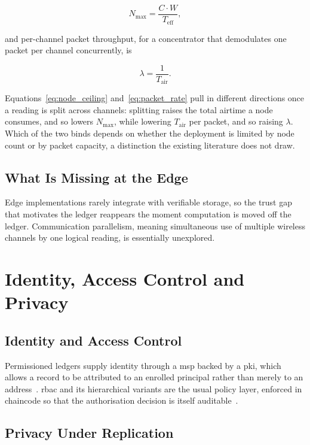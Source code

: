 \documentclass[12pt,a4paper,oneside]{book}
\begin{document}
\begin{equation}
  N_{\max} = \frac{C \cdot W}{T_{\text{eff}}},
  \label{eq:node_ceiling}
\end{equation}

and per-channel packet throughput, for a concentrator that demodulates one
packet per channel concurrently, is

\begin{equation}
  \lambda = \frac{1}{T_{\text{air}}}.
  \label{eq:packet_rate}
\end{equation}

Equations~\ref{eq:node_ceiling} and~\ref{eq:packet_rate} pull in different
directions once a reading is split across channels: splitting raises the total
airtime a node consumes, and so lowers $N_{\max}$, while lowering
$T_{\text{air}}$ per packet, and so raising $\lambda$. Which of the two binds
depends on whether the deployment is limited by node count or by packet
capacity, a distinction the existing literature does not draw.

\subsection{What Is Missing at the Edge}

Edge implementations rarely integrate with verifiable storage, so the trust gap
that motivates the ledger reappears the moment computation is moved off the
ledger. Communication parallelism, meaning simultaneous use of multiple
wireless channels by one logical reading, is essentially unexplored.

\section{Identity, Access Control and Privacy}
\label{sec:lit_privacy}

\subsection{Identity and Access Control}

Permissioned ledgers supply identity through a \gls{msp} backed by a
\gls{pki}, which allows a record to be attributed to an enrolled principal
rather than merely to an address~\cite{tar2023fabric, jayaram2023hyperledger}.
\gls{rbac} and its hierarchical variants are the usual policy layer, enforced
in chaincode so that the authorisation decision is itself
auditable~\cite{ferrag2020security}.

\subsection{Privacy Under Replication}
\end{document}
